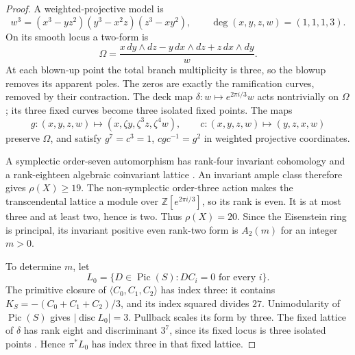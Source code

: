 \begin{proof}
A weighted-projective model is
\[
 w^3=(x^3-yz^2)(y^3-x^2z)(z^3-xy^2),\qquad
 \deg(x,y,z,w)=(1,1,1,3).
\]
On its smooth locus a two-form is
\[
 \Omega=\frac{x\,dy\wedge dz-y\,dx\wedge dz+z\,dx\wedge dy}{w}.
\]
At each blown-up point the total branch multiplicity is three, so
the blowup removes its apparent poles. The zeros are exactly the
ramification curves, removed by their contraction.
The deck map \(\delta:w\mapsto e^{2\pi i/3}w\) acts nontrivially on
\(\Omega\); its three fixed curves become three isolated fixed points.
The maps
\[
 g:(x,y,z,w)\mapsto(x,\zeta y,\zeta^3z,\zeta^4w),\qquad
 c:(x,y,z,w)\mapsto(y,z,x,w)
\]
preserve \(\Omega\), and satisfy \(g^7=c^3=1\),
\(cgc^{-1}=g^2\) in weighted projective coordinates.

A symplectic order-seven automorphism has rank-four invariant
cohomology and a rank-eighteen algebraic coinvariant lattice
\cite[Propositions 4.5--4.6]{geo_garbagnati_sarti2007}.
An invariant ample class therefore gives \(\rho(X)\ge19\).
The non-symplectic order-three action makes the transcendental
lattice a module over \(\mathbb Z[e^{2\pi i/3}]\), so its rank is
even. It is at most three and at least two, hence is two.
Thus \(\rho(X)=20\). Since the Eisenstein ring is principal, its
invariant positive even rank-two form is \(A_2(m)\) for an integer \(m>0\).

To determine \(m\), let
\[
 L_0=\{D\in\operatorname{Pic}(S):D C_i=0\text{ for every }i\}.
\]
The primitive closure of \(\langle C_0,C_1,C_2\rangle\) has index
three: it contains \(K_S=-(C_0+C_1+C_2)/3\), and its index squared
divides \(27\). Unimodularity of \(\operatorname{Pic}(S)\) gives
\(|\operatorname{disc}L_0|=3\).
Pullback scales its form by three. The fixed lattice of \(\delta\)
has rank eight and discriminant \(3^7\), since its fixed locus is
three isolated points \cite[Theorem 4.1]{geo_artebani_sarti_taki2011}.
Hence \(\pi^*L_0\) has index three in that fixed lattice.


\end{proof}
